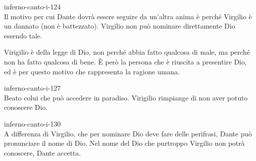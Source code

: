 \documentclass[preview]{standalone}
\begin{document}
\begin{snippet}{inferno-canto-i-124}
    \\
    Il motivo per cui Dante dovrà essere seguire da un'altra anima
    è perché Virgilio è un dannato (non è battezzato). 
    Virgilio non può nominare direttamente Dio essendo tale.

    Virigilio è  della legge di Dio, non perché abbia fatto qualcosa di male,
    ma perché non ha fatto qualcosa di bene. È però la persona che è riuscita a presentire Dio,
    ed è per questo motivo che rappresenta la ragione umana.
\end{snippet}

\begin{snippet}{inferno-canto-i-127}
    \\
    Beato colui che può accedere in paradiso. Virigilio rimpiange di non aver potuto conoscere Dio.
\end{snippet}

\begin{snippet}{inferno-canto-i-130}
    \\
    A differenza di Virgilio, che per nominare Dio deve fare delle perifrasi, Dante può pronunciare il nome di Dio.
    Nel nome del Dio che purtroppo Virgilio non potrà conoscere, Dante accetta.
\end{snippet}
\end{document}

